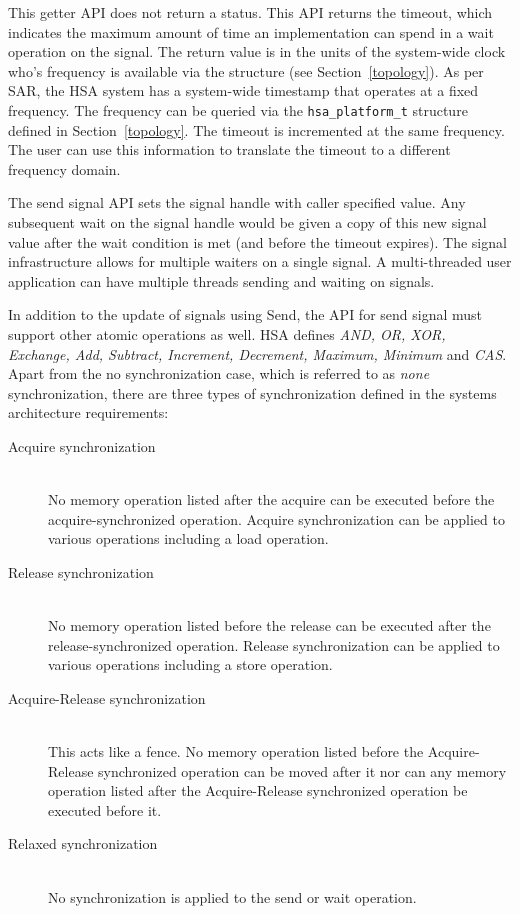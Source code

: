

This getter API does not return a status.  This API returns the
timeout, which indicates the maximum amount of time an
implementation can spend in a wait operation on the signal. The
return value is in the units of 
the system-wide clock who's frequency is available via the
 structure (see Section~\ref{topology}). As
per SAR, the HSA system has a system-wide timestamp that operates at
a fixed frequency. The frequency can be
queried via the \texttt{hsa\_platform\_t} structure defined in
Section~\ref{topology}. The timeout is incremented at the same
frequency.  The user can use this information to translate the
timeout to a different frequency domain. 

The send signal API sets the signal handle with caller specified
value. Any subsequent wait on the signal handle would be given 
a copy of this new signal value after the wait condition 
is met (and before the timeout expires).  The signal infrastructure
allows for multiple waiters on a single signal. A multi-threaded
user application can have multiple threads sending and waiting on
signals. 

In addition to the update of signals using
Send, the API for send signal must support other atomic operations as
well. HSA defines \emph {AND, OR, XOR, Exchange, Add, Subtract,
Increment, Decrement, Maximum, Minimum} and \emph{CAS}. Apart from
the no synchronization case, which is referred to as \emph{none}
synchronization, there are three types of synchronization defined in
the systems architecture requirements: 

\begin{description}
        \item[Acquire synchronization] \hfill \\ 
                No memory operation listed after the acquire can be
                executed before the acquire-synchronized operation. Acquire
                synchronization can be applied to various operations
                including a load operation.
        \item[Release synchronization] \hfill \\ 
                No memory operation listed before the release can be
                executed after the release-synchronized operation. Release
                synchronization can be applied to various operations
                including a store operation.
        \item[Acquire-Release synchronization] \hfill \\
                This acts like a fence. No memory operation listed
                before the Acquire-Release synchronized operation
                can be moved after it nor can any memory operation
                listed after the Acquire-Release synchronized
                operation be executed before it.
        \item[Relaxed synchronization] \hfill \\
                No synchronization is applied to the send or wait
                operation.
\end{description}
                
